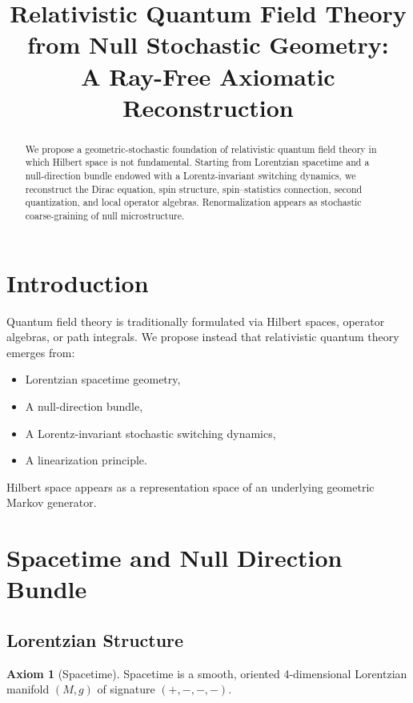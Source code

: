\documentclass[11pt]{article}
\title{
Relativistic Quantum Field Theory from Null Stochastic Geometry:\\
A Ray-Free Axiomatic Reconstruction
}
\author{}
\date{}
\theoremstyle{definition}
\newtheorem{axiom}[definition]{Axiom}
\begin{document}
\maketitle

\begin{abstract}
We propose a geometric-stochastic foundation of relativistic quantum
field theory in which Hilbert space is not fundamental.
Starting from Lorentzian spacetime and a null-direction bundle endowed
with a Lorentz-invariant switching dynamics,
we reconstruct the Dirac equation, spin structure,
spin–statistics connection, second quantization,
and local operator algebras.
Renormalization appears as stochastic coarse-graining of null microstructure.
\end{abstract}

\tableofcontents

\section{Introduction}

Quantum field theory is traditionally formulated via Hilbert spaces,
operator algebras, or path integrals.
We propose instead that relativistic quantum theory emerges from:

\begin{itemize}
\item Lorentzian spacetime geometry,
\item A null-direction bundle,
\item A Lorentz-invariant stochastic switching dynamics,
\item A linearization principle.
\end{itemize}

Hilbert space appears as a representation space of an underlying
geometric Markov generator.

\section{Spacetime and Null Direction Bundle}

\subsection{Lorentzian Structure}

\begin{axiom}[Spacetime]
Spacetime is a smooth, oriented 4-dimensional Lorentzian manifold
$(M,g)$ of signature $(+,-,-,-)$.
\end{axiom}
\end{document}
